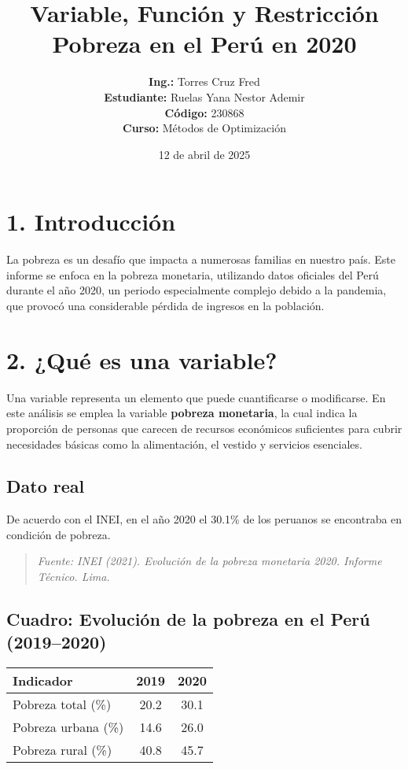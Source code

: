 \documentclass[12pt]{article}
\title{\textbf{Variable, Funci\'on y Restricci\'on} \\ \large \textbf{Pobreza en el Per\'u en 2020}}
\author{\textbf{Ing.:} Torres Cruz Fred \\ \textbf{Estudiante:} Ruelas Yana Nestor Ademir \\ \textbf{C\'odigo:} 230868 \\ \textbf{Curso:} M\'etodos de Optimizaci\'on}
\date{12 de abril de 2025}
\begin{document}
\maketitle

\section*{1. Introducci\'on}
La pobreza es un desafío que impacta a numerosas familias en nuestro país. Este informe se enfoca en la pobreza monetaria, utilizando datos oficiales del Perú durante el año 2020, un periodo especialmente complejo debido a la pandemia, que provocó una considerable pérdida de ingresos en la población.

\section*{2. \textbf{¿Qu\'e es una variable?}}
Una variable representa un elemento que puede cuantificarse o modificarse. En este análisis se emplea la variable \textbf{pobreza monetaria}, la cual indica la proporción de personas que carecen de recursos económicos suficientes para cubrir necesidades básicas como la alimentación, el vestido y servicios esenciales.

\subsection*{Dato real}
De acuerdo con el INEI, en el año 2020 el 30.1\% de los peruanos se encontraba en condición de pobreza.

\begin{quote}
\textit{Fuente: INEI (2021). Evolución de la pobreza monetaria 2020. Informe Técnico. Lima.}
\end{quote}

\subsection*{Cuadro: Evolución de la pobreza en el Perú (2019--2020)}
\begin{center}
\begin{tabular}{|>{\raggedright}m{5cm}|c|c|}
\hline
\textbf{Indicador} & \textbf{2019} & \textbf{2020} \\
\hline
Pobreza total (\%) & 20.2 & 30.1 \\
\hline
Pobreza urbana (\%) & 14.6 & 26.0 \\
\hline
Pobreza rural (\%) & 40.8 & 45.7 \\
\hline
\end{tabular}
\end{center}
\end{document}
